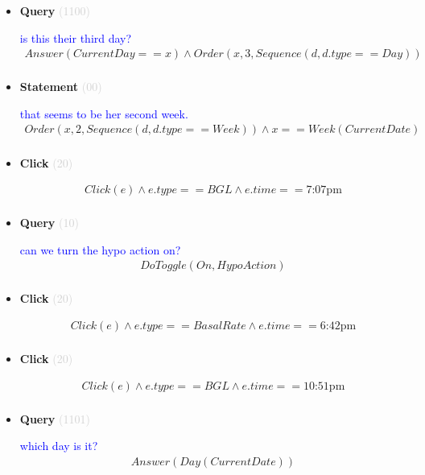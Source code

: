\documentclass[11pt]{article}
\newcommand{\key}[1]{\textcolor{lightgray}{#1}}
\newcounter{CQuery}
\newcounter{CStatement}
\newcounter{CClick}
\begin{document}
\begin{itemize}
\item
\textbf{Query\theCQuery} \key{(1100)} \addtocounter{CQuery}{1}
\textcolor{blue}{ is this their third day? }
\begin{multline*}
Answer(CurrentDay==x) \wedge Order(x, 3, Sequence(d, d.type==Day)) \\ 
\end{multline*}


\item
\textbf{Statement\theCStatement} \key{(00)} \addtocounter{CStatement}{1}
\textcolor{blue}{ that seems to be her second week. }
\begin{multline*}
Order(x, 2, Sequence(d, d.type==Week)) \wedge x==Week(CurrentDate) \\ 
\end{multline*}


\item
\textbf{Click\theCClick} \key{(20)} \addtocounter{CClick}{1}
\textcolor{blue}{  }
\begin{multline*}
Click(e) \wedge e.type==BGL \wedge e.time==\mbox{7:07pm} \\ 
\end{multline*}


\item
\textbf{Query\theCQuery} \key{(10)} \addtocounter{CQuery}{1}
\textcolor{blue}{ can we turn the hypo action on? }
\begin{multline*}
DoToggle(On, HypoAction) \\ 
\end{multline*}


\item
\textbf{Click\theCClick} \key{(20)} \addtocounter{CClick}{1}
\textcolor{blue}{  }
\begin{multline*}
Click(e) \wedge e.type==BasalRate \wedge e.time==\mbox{6:42pm} \\ 
\end{multline*}


\item
\textbf{Click\theCClick} \key{(20)} \addtocounter{CClick}{1}
\textcolor{blue}{  }
\begin{multline*}
Click(e) \wedge e.type==BGL \wedge e.time==\mbox{10:51pm} \\ 
\end{multline*}


\item
\textbf{Query\theCQuery} \key{(1101)} \addtocounter{CQuery}{1}
\textcolor{blue}{ which day is it? }
\begin{multline*}
Answer(Day(CurrentDate)) \\ 
\end{multline*}



\end{itemize}
\end{document}
